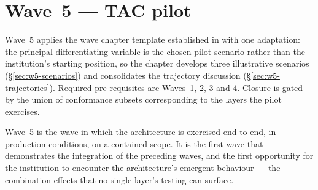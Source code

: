 
\chapter{Wave~5 --- TAC pilot}
\label{ch:wave5-pilot}

\begin{caveatbox}
\noindent Wave~5 applies the wave chapter template established in
 with one adaptation: the principal
differentiating variable is the chosen pilot scenario rather than
the institution's starting position, so the chapter develops three
illustrative scenarios (\S\ref{sec:w5-scenarios}) and consolidates
the trajectory discussion (\S\ref{sec:w5-trajectories}). Required
pre-requisites are Waves~1, 2, 3 and 4. Closure is gated by the
union of conformance subsets corresponding to the layers the pilot
exercises.
\end{caveatbox}

Wave~5 is the wave in which the architecture is exercised
end-to-end, in production conditions, on a contained scope. It is
the first wave that demonstrates the integration of the
preceding waves, and the first opportunity for the institution to
encounter the architecture's emergent behaviour --- the
combination effects that no single layer's testing can surface.

